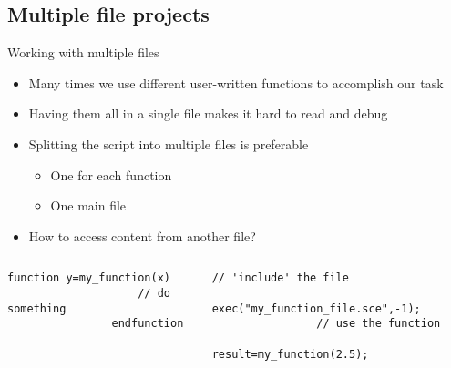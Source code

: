 \subsection{Multiple file projects}
\begin{frame}[fragile]{Working with multiple files}
    \begin{itemize}
        \setitemsep{1em}
        \item Many times we use different user-written functions to accomplish our task
        \item Having them all in a single file makes it hard to read and debug
        \item<2-> Splitting the script into multiple files is preferable
        \begin{itemize}
            \item One for each function
            \item One main file
        \end{itemize}
        \item<3-> How to access content from another file?
    \end{itemize}
    \begin{columns}
        \begin{column}{0.5\linewidth}
            \begin{lstlisting}[title={\small \inlinecode{my\_function\_file.sce}}]
                function y=my_function(x)
                    // do something
                endfunction
            \end{lstlisting}
        \end{column}
        \begin{column}{0.5\linewidth}
            \begin{lstlisting}[title={\small \inlinecode{main.sce}}]
                // 'include' the file
                exec("my_function_file.sce",-1);
                // use the function
                result=my_function(2.5);
            \end{lstlisting}
        \end{column}
    \end{columns}
\end{frame}

